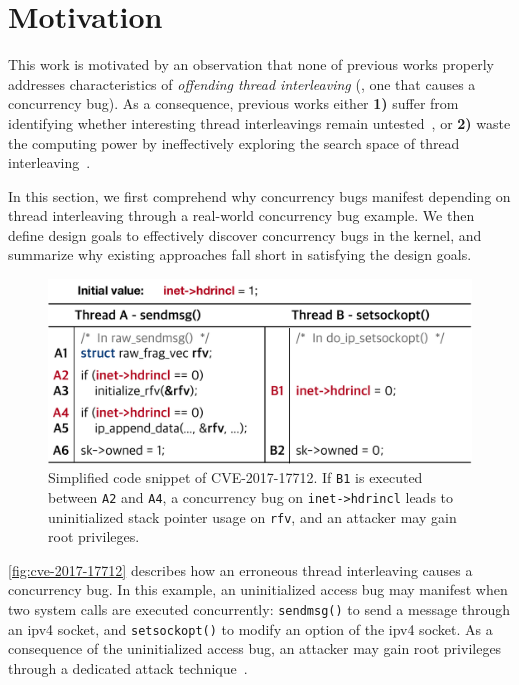 \section{Motivation}
\label{s:motivation}


This work is motivated by an observation that none of previous works
properly addresses characteristics of \textit{offending thread
  interleaving} (\ie, one that causes a concurrency bug).
%
As a consequence, previous works either \textbf{1)} suffer from
identifying whether interesting thread interleavings remain
untested~\cite{krace, conzzer, muzz}, or \textbf{2)} waste the
computing power by ineffectively exploring the search space of thread
interleaving~\cite{snowboard, razzer}.



In this section, we first comprehend why concurrency bugs manifest
depending on thread interleaving through a real-world concurrency bug
example.
%
We then define design goals to effectively discover concurrency bugs
in the kernel, and summarize why existing approaches fall short in
satisfying the design goals.


%
\begin{figure}[t]
  \centering
  \includegraphics[width=0.95\linewidth]{fig/cve-2017-10661.pdf}
  \caption{Simplified code snippet of CVE-2017-17712. If \texttt{B1} is
    executed between \texttt{A2} and \texttt{A4}, a concurrency bug on
    \texttt{inet->hdrincl} leads to uninitialized stack pointer usage
    on \texttt{rfv}, and an attacker may gain root privileges.}
  \label{fig:cve-2017-17712}
\end{figure}
%
\autoref{fig:cve-2017-17712} describes how an erroneous thread
interleaving causes a concurrency bug.
%
In this example, an uninitialized access bug may manifest when two
system calls are executed concurrently: \texttt{sendmsg()} to send a
message through an ipv4 socket, and \texttt{setsockopt()} to modify an
option of the ipv4 socket. As a consequence of the uninitialized
access bug, an attacker may gain root privileges through a dedicated
attack technique~\cite{stackspray}.



